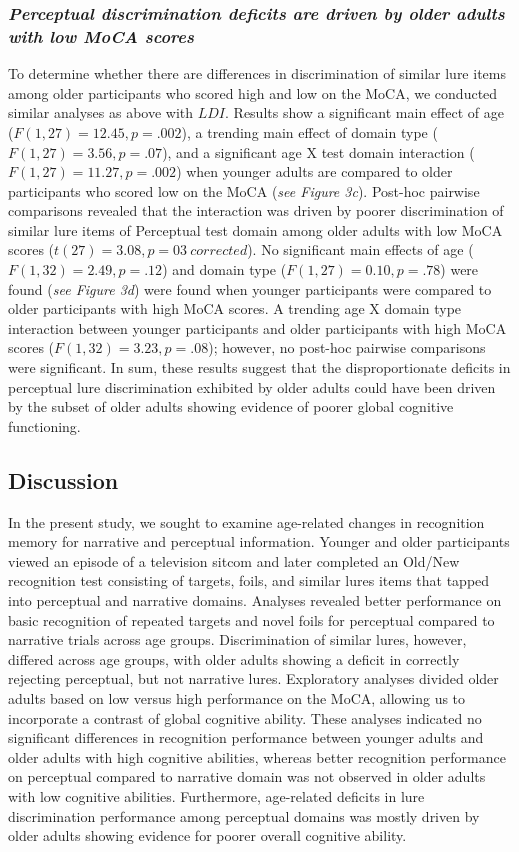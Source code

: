 \documentclass[11pt]{article}
\begin{document}
\subsubsection*{\textit{Perceptual discrimination deficits are driven by older adults with low MoCA scores}}
To determine whether there are differences in discrimination of similar lure items among older participants who scored high and low on the MoCA, we conducted similar analyses as above with $LDI$. Results show a significant main effect of age ($F(1, 27) = 12.45, p = .002$), a trending main effect of domain type ($F(1, 27) = 3.56, p = .07$), and a significant age X test domain interaction ($F(1, 27) = 11.27, p = .002$) when younger adults are compared to older participants who scored low on the MoCA (\textit{see Figure 3c}). Post-hoc pairwise comparisons revealed that the interaction was driven by poorer discrimination of similar lure items of Perceptual test domain among older adults with low MoCA scores ($t(27) = 3.08, p = 03 \ corrected$). No significant main effects of age ($F(1, 32) = 2.49, p = .12$) and domain type ($F(1, 27) = 0.10, p = .78$) were found (\textit{see Figure 3d}) were found when younger participants were compared to older participants with high MoCA scores. A trending age X domain type interaction between younger participants and older participants with high MoCA scores ($F(1, 32) = 3.23, p = .08$); however, no post-hoc pairwise comparisons were significant. In sum, these results suggest that the disproportionate deficits in perceptual lure discrimination exhibited by older adults could have been driven by the subset of older adults showing evidence of poorer global cognitive functioning.

\subsection*{Discussion}
In the present study, we sought to examine age-related changes in recognition memory for narrative and perceptual information. Younger and older participants viewed an episode of a television sitcom and later completed an Old/New recognition test consisting of targets, foils, and similar lures items that tapped into perceptual and narrative domains. Analyses revealed better performance on basic recognition of repeated targets and novel foils for perceptual compared to narrative trials across age groups. Discrimination of similar lures, however, differed across age groups, with older adults showing a deficit in correctly rejecting perceptual, but not narrative lures. Exploratory analyses divided older adults based on low versus high performance on the MoCA, allowing us to incorporate a contrast of global cognitive ability. These analyses indicated no significant differences in recognition performance between younger adults and older adults with high cognitive abilities, whereas better recognition performance on perceptual compared to narrative domain was not observed in older adults with low cognitive abilities. Furthermore, age-related deficits in lure discrimination performance among perceptual domains was mostly driven by older adults showing evidence for poorer overall cognitive ability.
\end{document}

